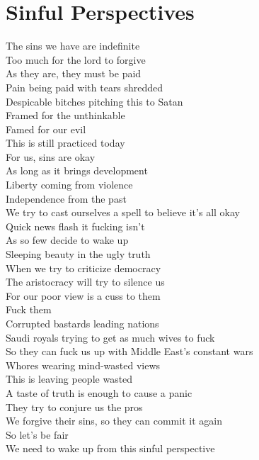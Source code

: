 \documentclass[12pt, b5paper]{article}
\begin{document}
\section{Sinful Perspectives}
\par The sins we have are indefinite 
\\Too much for the lord to forgive 
\\As they are, they must be paid 
\\Pain being paid with tears shredded 
\\Despicable bitches pitching this to Satan
\\Framed for the unthinkable
\\Famed for our evil
\\This is still practiced today 
\\For us, sins are okay
\\As long as it brings development 
\\Liberty coming from violence 
\\Independence from the past 
\\We try to cast ourselves a spell to believe it's all okay
\\Quick news flash it fucking isn't 
\\As so few decide to wake up 
\\Sleeping beauty in the ugly truth
\\When we try to criticize democracy
\\The aristocracy will try to silence us 
\\For our poor view is a cuss to them
\\Fuck them
\\Corrupted bastards leading nations 
\\Saudi royals trying to get as much wives to fuck 
\\So they can fuck us up with Middle East's constant wars 
\\Whores wearing mind-wasted views 
\\This is leaving people wasted 
\\A taste of truth is enough to cause a panic 
\\They try to conjure us the pros 
\\We forgive their sins, so they can commit it again 
\\So let's be fair 
\\We need to wake up from this sinful perspective

\newpage 
\end{document}

